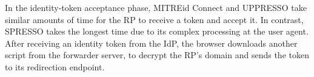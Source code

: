 In the identity-token acceptance phase, 
MITREid Connect and UPPRESSO take similar amounts of time for the RP to receive a token and accept it.
In contrast, SPRESSO takes the longest time due to its complex processing at the user agent.
After receiving an identity token from the IdP, the browser downloads another script from the forwarder server, to decrypt the RP's domain and sends the token to its redirection endpoint.
